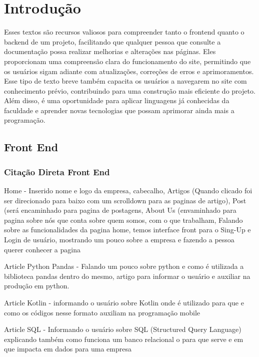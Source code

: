 \chapter{Introdução}
\label{ch:introducao}
\begin{resumocapitulo}
	Esses textos são recursos valiosos para compreender tanto o frontend quanto o backend de um projeto, facilitando que qualquer pessoa que consulte a documentação possa realizar melhorias e alterações nas páginas. Eles proporcionam uma compreensão clara do funcionamento do site, permitindo que os usuários sigam adiante com atualizações, correções de erros e aprimoramentos. Esse tipo de texto breve também capacita os usuários a navegarem no site com conhecimento prévio, contribuindo para uma construção mais eficiente do projeto. Além disso, é uma oportunidade para aplicar linguagens já conhecidas da faculdade e aprender novas tecnologias que possam aprimorar ainda mais a programação.
\end{resumocapitulo}


\label{sec:citacoes}

\section{Front End}
\subsection{Citação Direta Front End}
\label{subsec:citacao_direta}
 Home - Inserido nome e logo da empresa, cabecalho, Artigos (Quando clicado foi ser direcionado para baixo com um scrolldown para as paginas de artigo), Post (será encaminhado para pagina de postagens, About Us (envaminhado para pagina sobre nós  que conta sobre quem somos, com o que trabalham,
Falando sobre as funcionalidades da pagina home, temos interface front para o Sing-Up e Login de usuário, mostrando um pouco sobre a empresa e fazendo a pessoa querer conhecer a pagina
\vspace{12pt}

Article Python Pandas - Falando um pouco sobre python e como é utilizada a biblioteca pandas dentro do mesmo, artigo para informar o usuário e auxiliar na produção em python.

Article Kotlin - informando o usuário sobre Kotlin onde é utilizado para que e como os códigos nesse formato auxiliam na programação mobile

Article SQL - Informando o usuário sobre SQL (Structured Query Language) explicando também como funciona um banco relacional o para que serve e em que impacta em dados para uma empresa

